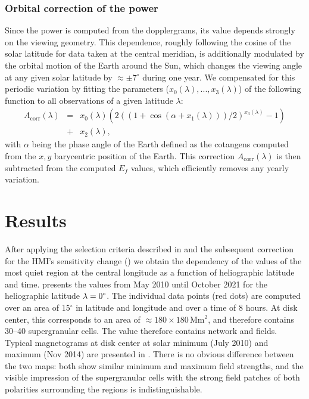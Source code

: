 \documentclass{aa}
\begin{document}
\subsubsection*{Orbital correction of the \fff power}

Since the \fff power is computed from the \los{} dopplergrams, its value depends strongly on the viewing geometry. This dependence,  roughly following the cosine of the solar latitude for data taken at the central meridian, is additionally modulated by the orbital motion of the Earth around the Sun, which changes the viewing angle at any given solar latitude by $\approx\pm7^\circ$ during one year. We compensated for this periodic variation by fitting the parameters ($x_0(\lambda), ..., x_3(\lambda)$) of the following function to all observations of a given latitude $\lambda$:
\begin{eqnarray}
\label{eq:orbitcorr}
A_{\mbox{corr}}(\lambda) &=& x_0(\lambda) (  2 ( (1+\cos(\alpha+x_1(\lambda)))/2)^{x_3(\lambda)}-1   )\nonumber \\
&+&x_2(\lambda),
\end{eqnarray}
with $\alpha$ being the phase angle of the Earth defined as the cotangens computed from the $x,y$ barycentric position of the Earth.
This correction $A_{\mbox{corr}}(\lambda)$ is then subtracted from the computed 
$E_f$ values, which efficiently removes any yearly variation. 



\section{Results}\label{results}

After applying the selection criteria described in  and the subsequent correction for the 
HMI's
sensitivity change () we obtain the dependency of the \brms{} values of the most quiet region at the central longitude as a function of heliographic latitude and time.  presents the \brms{} values from May 2010 until October 2021 for the heliographic latitude $\lambda = 0\degree$. The individual data points (red dots) are computed over an area of 15$^\circ$ in latitude and longitude and over a time of 8 hours. At disk center, this corresponds to an area of $\approx 180 \times 180$\,Mm$^2$, and therefore contains 30--40 supergranular cells. The \brms{} value 
therefore contains
network and \IN{} fields.
Typical magnetograms at disk center at solar minimum (July 2010) and maximum (Nov 2014) are presented in . There is no obvious difference between the two maps: both show similar minimum and maximum field strengths, and the visible impression of the supergranular cells with the strong field patches of both polarities surrounding the \IN{} regions is indistinguishable.
\end{document}
